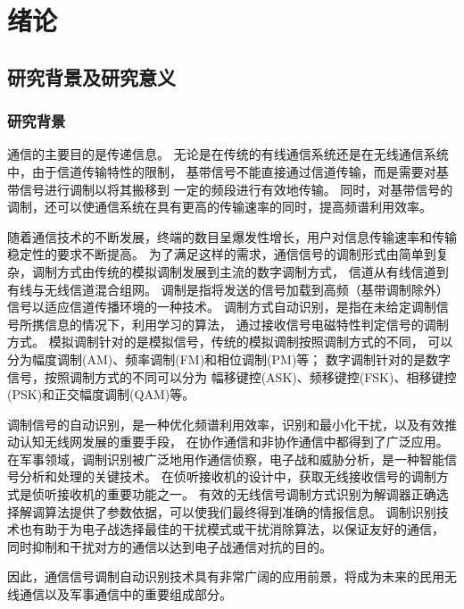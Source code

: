 \chapter{绪论}
\section{研究背景及研究意义}

\subsection{研究背景}
通信的主要目的是传递信息。 
无论是在传统的有线通信系统还是在无线通信系统中，由于信道传输特性的限制，
基带信号不能直接通过信道传输，而是需要对基带信号进行调制以将其搬移到 一定的频段进行有效地传输\cite{昌信2006通信原理}。 
同时，对基带信号的调制，还可以使通信系统在具有更高的传输速率的同时，提高频谱利用效率。\par

随着通信技术的不断发展，终端的数目呈爆发性增长，用户对信息传输速率和传输稳定性的要求不断提高。
为了满足这样的需求，通信信号的调制形式由简单到复杂，调制方式由传统的模拟调制发展到主流的数字调制方式，
信道从有线信道到有线与无线信道混合组网。
调制是指将发送的信号加载到高频（基带调制除外）信号以适应信道传播环境的一种技术。
调制方式自动识别，是指在未给定调制信号所携信息的情况下，利用学习的算法，
通过接收信号电磁特性判定信号的调制方式。
模拟调制针对的是模拟信号，传统的模拟调制按照调制方式的不同，
可以分为幅度调制(AM)、频率调制(FM)和相位调制(PM)等；
数字调制针对的是数字信号，按照调制方式的不同可以分为
幅移键控(ASK)、频移键控(FSK)、相移键控(PSK)和正交幅度调制(QAM)等。 \par

调制信号的自动识别，是一种优化频谱利用效率，识别和最小化干扰，以及有效推动认知无线网发展的重要手段，
在协作通信和非协作通信中都得到了广泛应用\cite{nandi1995automatic}。
在军事领域，调制识别被广泛地用作通信侦察，电子战和威胁分析，是一种智能信号分析和处理的关键技术\cite{程汉文2009基于累计量的干扰信号调制识别算法}\cite{张春磊2013认知电子战初探}。
在侦听接收机的设计中，获取无线接收信号的调制方式是侦听接收机的重要功能之一。
有效的无线信号调制方式识别为解调器正确选择解调算法提供了参数依据，可以使我们最终得到准确的情报信息。
调制识别技术也有助于为电子战选择最佳的干扰模式或干扰消除算法，以保证友好的通信，
同时抑制和干扰对方的通信以达到电子战通信对抗的目的。\par

因此，通信信号调制自动识别技术具有非常广阔的应用前景，将成为未来的民用无线通信以及军事通信中的重要组成部分。\par

